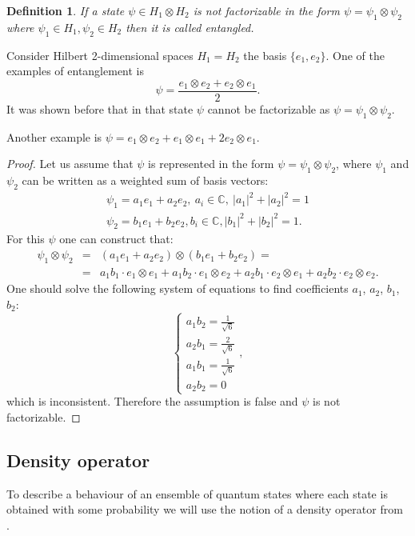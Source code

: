 \documentclass[11pt]{article}
\newtheorem{definition}{Definition}[section]
\begin{document}
\begin{definition}
If a state $\psi\in H_1\otimes H_2$ is not factorizable in the form $\psi = \psi_1\otimes\psi_2$ where $\psi_1\in H_1, \psi_2\in H_2$ then it is called entangled.
\end{definition}  
Consider Hilbert 2-dimensional spaces $H_1 = H_2$ the basis $\{e_1, e_2\}$. One of the examples of entanglement is 
\[
\psi = \frac{e_1\otimes e_2 + e_2\otimes e_1}{2}.
\]
It was shown before that in that state $\psi$ cannot be factorizable as $\psi = \psi_1\otimes\psi_2$.

Another example is $\psi = e_1\otimes e_2 + e_1 \otimes e_1 + 2e_2 \otimes e_1$.

\begin{proof}
Let us assume that $\psi$ is represented in the form $\psi = \psi_1\otimes\psi_2$, where $\psi_1$ and $\psi_2$ can be written as a weighted sum of basis vectors:
\begin{gather*}
	\psi_1 = a_1 e_1 + a_2 e_2,\ a_i\in \mathbb{C},\ |a_1|^2 + |a_2|^2 = 1 \\
	\psi_2 = b_1 e_1 + b_2 e_2, b_i\in \mathbb{C}, |b_1|^2 + |b_2|^2 = 1.
\end{gather*}
For this $\psi$ one can construct that:
\begin{eqnarray*}
	\psi_1 \otimes \psi_2 &=& (a_1 e_1 + a_2 e_2) \otimes (b_1 e_1 + b_2 e_2) = \\ &=&  
	a_1 b_1 \cdot e_1 \otimes e_1 + a_1 b_2 \cdot e_1 \otimes e_2 + 
	a_2 b_1 \cdot e_2 \otimes e_1 + a_2 b_2 \cdot e_2 \otimes e_2.
\end{eqnarray*}
One should solve the following system of equations to find coefficients $a_1$, $a_2$, $b_1$, $b_2$:
$$
\begin{cases}
a_1 b_2 = \frac{1}{\sqrt{6}} \\
a_2 b_1 = \frac{2}{\sqrt{6}} \\
a_1 b_1 = \frac{1}{\sqrt{6}} \\
a_2 b_2 = 0
\end{cases},
$$
which is inconsistent. Therefore the assumption is false and $\psi$ is not factorizable.
\end{proof}


\subsection{Density operator}

To describe a behaviour of an ensemble of quantum states where each state is obtained with some probability we will use the notion of a density operator from \cite{Khrennikov_information}.
\end{document}
